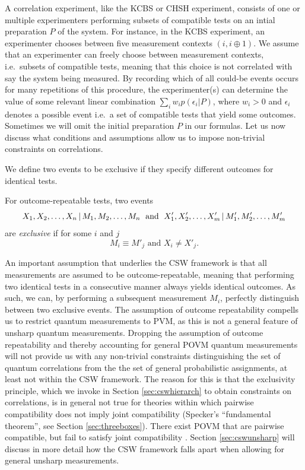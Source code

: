 A correlation experiment, like the KCBS or CHSH experiment, consists of one or multiple experimenters performing subsets of compatible tests on an intial preparation $P$ of the system. For instance, in the KCBS experiment, an experimenter chooses between five measurement contexts $(i,i\oplus 1)$. We assume that an experimenter can freely choose between measurement contexts, i.e.\ subsets of compatible tests, meaning that this choice is not correlated with say the system being measured. By recording which of all could-be events occurs for many repetitions of this procedure, the experimenter(s) can determine the value of some relevant linear combination $\sum_i w_i p(\epsilon_i\vert P)$, where $w_i>0$ and $\epsilon_i$ denotes a possible event i.e.\ a set of compatible tests that yield some outcomes. Sometimes we will omit the initial preparation $P$ in our formulas. Let us now discuss what conditions and assumptions allow us to impose non-trivial constraints on correlations.

We define two events to be exclusive if they specify different outcomes for identical tests.
\begin{definition}
\label{def:exclevents}
For outcome-repeatable tests, two events
\begin{equation*}
X_1,X_2,\dots, X_n\thinspace\vert\thinspace M_1,M_2,\dots, M_n\;\text{ and }\; X'_1,X'_2,\dots, X'_m\thinspace\vert\thinspace M'_1,M'_2,\dots, M'_m  
\end{equation*} are \emph{exclusive} if for some $i$ and $j$
\begin{equation*}
    M_i \equiv M'_j \text{ and } X_i \neq X'_j.
\end{equation*}
\end{definition}

An important assumption that underlies the CSW framework is that all measurements are assumed to be outcome-repeatable, meaning that performing two identical tests in a consecutive manner always yields identical outcomes. As such, we can, by performing a subsequent measurement $M_i$, perfectly distinguish between two exclusive events. The assumption of outcome repeatability compells us to restrict quantum measurements to PVM, as this is not a general feature of unsharp quantum measurements. Dropping the assumption of outcome repeatability and thereby accounting for general POVM quantum measurements will not provide us with any non-trivial constraints distinguishing the set of quantum correlations from the the set of general probabilistic assignments, at least not within the CSW framework. The reason for this is that the exclusivity principle, which we invoke in Section \ref{sec:cswhierarch} to obtain constraints on correlations, is in general not true for theories within which pairwise compatibility does not imply joint compatibility (Specker's ``fundamental theorem'', see Section \ref{sec:threeboxes}). There exist POVM that are pairwise compatible, but fail to satisfy joint compatibility \cite{Heunen2014}. Section \ref{sec:cswunsharp} will discuss in more detail how the CSW framework falls apart when allowing for general unsharp measurements.

